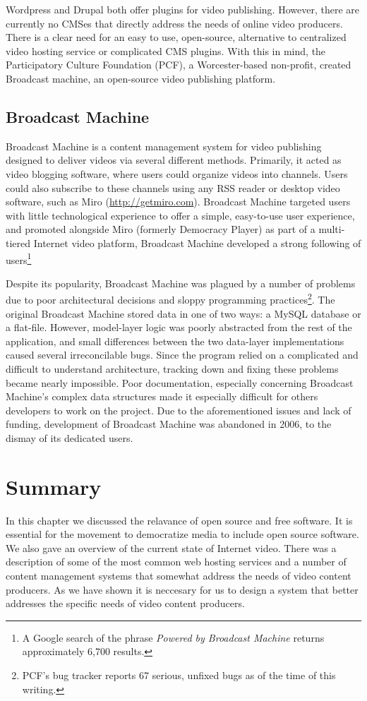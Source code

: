 \documentclass[a4paper,12pt]{report}
\begin{document}
Wordpress and Drupal both offer plugins for video publishing. However, there are currently no CMSes that directly address the needs of online video producers. There is a clear need for an easy to use, open-source, alternative to centralized video hosting service or complicated CMS plugins. With this in mind, the Participatory Culture Foundation (PCF), a Worcester-based non-profit, created Broadcast machine, an open-source video publishing platform.

\subsection {Broadcast Machine}
Broadcast Machine is a content management system for video publishing designed to deliver videos via several different methods. Primarily, 
it acted as video blogging software, where users could organize videos into channels. Users could also subscribe to these channels using any RSS reader or desktop video software, such as Miro (\url{http://getmiro.com}). Broadcast Machine targeted users with little technological experience to offer a simple, easy-to-use user experience, and promoted alongside Miro (formerly Democracy Player) as part of a multi-tiered Internet video platform, Broadcast Machine developed a strong following of users\footnote{A Google search of the phrase \textit{Powered by Broadcast Machine} returns approximately 6,700 results.}

Despite its popularity, Broadcast Machine was plagued by a number of problems due to poor architectural decisions and sloppy programming practices\footnote{PCF's bug tracker reports 67 serious, unfixed bugs as of the time of this writing.}. The original Broadcast Machine stored data in one of two ways: a MySQL database or a flat-file. However, model-layer logic was poorly abstracted from the rest of the application, and small differences between the two data-layer implementations caused several irreconcilable bugs. Since the program relied on a complicated and difficult to understand architecture, tracking down and fixing these problems became nearly impossible. Poor documentation, especially concerning Broadcast Machine's complex data structures made it especially difficult for others developers to work on the project. Due to the aforementioned issues and lack of funding, development of Broadcast Machine was abandoned in 2006, to the dismay of its dedicated users.

\section{Summary}
In this chapter we discussed the relavance of open source and free software. It is essential for the movement to democratize
media to include open source software. We also gave an overview of the current state of Internet video. There was a description of some
of the most common web hosting services and a number of content management systems that somewhat address the needs of video content
producers. As we have shown it is neccesary for us to design a system that better addresses the specific needs of video content producers.
\end{document}

